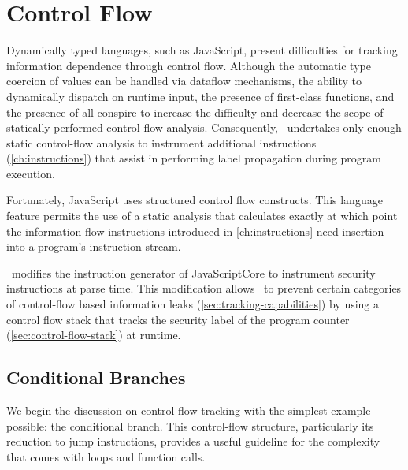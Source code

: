 \section{Control Flow}

Dynamically typed languages, such as JavaScript, present difficulties for tracking information dependence through control flow.
Although the automatic type coercion of values can be handled via dataflow mechanisms, the ability to dynamically dispatch on runtime input, the presence of first-class functions, and the presence of  all conspire to increase the difficulty and decrease the scope of statically performed control flow analysis.
Consequently, \FlowCore\ undertakes only enough static control-flow analysis to instrument additional instructions (\autoref{ch:instructions}) that assist in performing label propagation during program execution.

Fortunately, JavaScript uses structured control flow constructs.
This language feature permits the use of a static analysis that calculates exactly at which point the information flow instructions introduced in \autoref{ch:instructions} need insertion into a program's instruction stream.

\FlowCore\ modifies the instruction generator of JavaScriptCore to instrument security instructions at parse time.
This modification allows \FlowCore\ to prevent certain categories of control-flow based information leaks (\autoref{sec:tracking-capabilities}) by using a control flow stack that tracks the security label of the program counter (\autoref{sec:control-flow-stack}) at runtime.


\subsection{Conditional Branches}
\label{sec:conditional-branch}

We begin the discussion on control-flow tracking with the simplest example possible: the conditional branch.
This control-flow structure, particularly its reduction to jump instructions, provides a useful guideline for the complexity that comes with loops and function calls.


